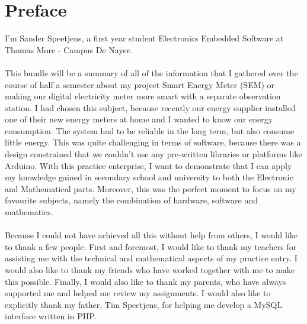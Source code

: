 \documentclass[a4paper,twoside, 12pt]{report}
\theoremstyle{break}
\begin{document}
\chapter*{Preface}
\thispagestyle{empty}
I'm Sander Speetjens, a first year student Electronics Embedded Software at Thomas More - Campus De Nayer.
\ \\ \ \\
This bundle will be a summary of all of the information that I gathered over the course of half a semester about my project Smart Energy Meter (SEM) or making our digital electricity meter more smart with a separate observation station. I had chosen this subject, because recently our energy supplier installed one of their new energy meters at home and I wanted to know our energy consumption. The system had to be reliable in the long term, but also consume little energy. This was quite challenging in terms of software, because there was a design constrained that we couldn't use any pre-written libraries or platforms like Arduino. With this practice enterprise, I want to demonstrate that I can apply my knowledge gained in secondary school and university to both the Electronic and Mathematical parts. Moreover, this was the perfect moment to focus on my favourite subjects, namely the combination of hardware, software and mathematics.
\ \\ \ \\
Because I could not have achieved all this without help from others, I would like to thank a few people. First and foremost, I would like to thank my teachers for assisting me with the technical and mathematical aspects of my practice entry.  I would also like to thank my friends who have worked together with me to make this possible. 
Finally, I would also like to thank my parents, who have always supported me and helped me review my assignments.  I would also like to explicitly thank my father, Tim Speetjens, for helping me develop a MySQL interface written in PHP.
\vfill
\eject


\clearpage{\pagestyle{empty}\cleardoublepage}


\setcounter{section}{0}
\setcounter{subsection}{0}

\tableofcontents
\thispagestyle{empty}

\vfill

\eject

\vfill
\end{document}
